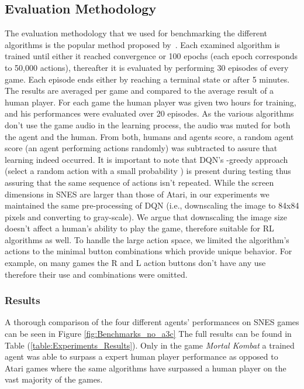 \documentclass{article}
\begin{document}
\subsection{Evaluation Methodology}
The evaluation methodology that we used for benchmarking the different algorithms is the popular method proposed by~\citep{mnih2015human}. Each examined algorithm is trained until either it reached convergence or 100 epochs (each epoch corresponds to 50,000 actions), thereafter it is evaluated by performing 30 episodes of every game. 
Each episode ends either by reaching a terminal state or after 5 minutes. 
The results are averaged per game and compared to the average result of a human player. 
For each game the human player was given two hours for training, and his performances were evaluated over 20 episodes. 
As the various algorithms don't use the game audio in the learning process, the audio was muted for both the agent and the human. 
From both, humans and agents score, a random agent score (an agent performing actions randomly) was subtracted to assure that learning indeed occurred. It is important to note that DQN's -greedy approach (select a random action with a small probability ) is present during testing thus assuring that the same sequence of actions isn't repeated.
While the screen dimensions in SNES are larger than those of Atari, in our experiments we maintained the same pre-processing of DQN (i.e., downscaling the image to 84x84 pixels and converting to gray-scale).
We argue that downscaling the image size doesn't affect a human's ability to play the game, therefore suitable for RL algorithms as well. 
To handle the large action space, we limited the algorithm's actions to the minimal button combinations which provide unique behavior. For example, on many games the R and L action buttons don't have any use therefore their use and combinations were omitted.

\subsubsection{Results}
A thorough comparison of the four different agents' performances on SNES games can be seen in Figure
\ref{fig:Benchmarks_no_a3c}
The full results can be found in Table (\ref{table:Experiments_Results}).
Only in the game \textit{Mortal Kombat} a trained agent was able to surpass a expert human player performance as opposed to Atari games where the same algorithms have surpassed a human player on the vast majority of the games.
\end{document}
